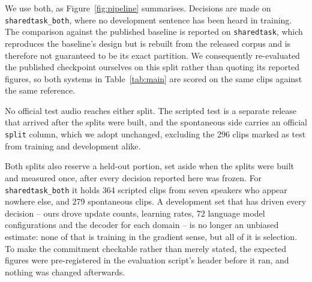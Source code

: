 We use both, as Figure~\ref{fig:pipeline} summarises. Decisions are made on
\texttt{sharedtask\_both}, where no development sentence has been heard in
training. The comparison against the published baseline is reported on
\texttt{sharedtask}, which reproduces the baseline's design but is rebuilt from
the released corpus and is therefore not guaranteed to be its exact partition.
We consequently re-evaluated the published checkpoint ourselves on this split
rather than quoting its reported figures, so both systems in
Table~\ref{tab:main} are scored on the same clips against the same reference.

No official test audio reaches either split. The scripted test is a separate
release that arrived after the splits were built, and the spontaneous side
carries an official \texttt{split} column, which we adopt unchanged, excluding
the 296 clips marked as test from training and development alike.

Both splits also reserve a held-out portion, set aside when the splits were
built and measured once, after every decision reported here was frozen. For
\texttt{sharedtask\_both} it holds 364 scripted clips from seven speakers who
appear nowhere else, and 279 spontaneous clips. A development set that has
driven every decision -- ours drove update counts, learning rates, 72 language
model configurations and the decoder for each domain -- is no longer an
unbiased estimate: none of that is training in the gradient sense, but all of
it is selection. To make the commitment checkable rather than merely stated,
the expected figures were pre-registered in the evaluation script's header
before it ran, and nothing was changed afterwards.
